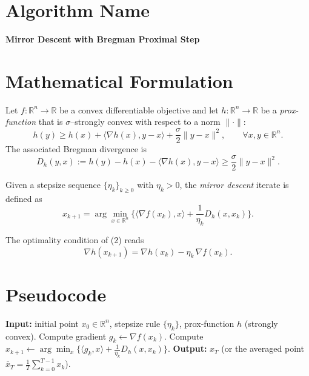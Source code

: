 \documentclass[11pt]{article}
\newcommand{\R}{\mathbb{R}}
\begin{document}
\section*{Algorithm Name}
\textbf{Mirror Descent with Bregman Proximal Step}

\section*{Mathematical Formulation}
Let $f:\R^{n}\rightarrow\R$ be a convex differentiable objective and let 
$h:\R^{n}\rightarrow\R$ be a \emph{prox‐function} that is $\sigma$–strongly convex
with respect to a norm $\|\cdot\|$:
\[
h(y)\ge h(x)+\langle\nabla h(x),y-x\rangle+\frac{\sigma}{2}\|y-x\|^{2},
\qquad\forall x,y\in\R^{n}.
\]
The associated Bregman divergence is
\[
D_{h}(y,x):=h(y)-h(x)-\langle\nabla h(x),y-x\rangle\ge
\frac{\sigma}{2}\|y-x\|^{2}. \tag{1}
\]

Given a stepsize sequence $\{\eta_{k}\}_{k\ge0}$ with $\eta_{k}>0$, the
\emph{mirror descent} iterate is defined as
\[
x_{k+1}
= \arg\min_{x\in\R^{n}}\Big\{
\langle \nabla f(x_{k}),x\rangle
+\frac{1}{\eta_{k}} D_{h}(x,x_{k})
\Big\}. \tag{2}
\]

The optimality condition of (2) reads
\[
\nabla h(x_{k+1}) = \nabla h(x_{k}) - \eta_{k}\,\nabla f(x_{k}). \tag{3}
\]

\section*{Pseudocode}
\begin{algorithm}[H]
\caption{Mirror Descent}
\begin{algorithmic}[1]
\State \textbf{Input:} initial point $x_{0}\in\R^{n}$, stepsize rule $\{\eta_{k}\}$,
prox‑function $h$ (strongly convex).
    \State Compute gradient $g_{k}\gets \nabla f(x_{k})$.
    \State Compute 
    $x_{k+1}\gets\arg\min_{x}\big\{\langle g_{k},x\rangle+\frac{1}{\eta_{k}}D_{h}(x,x_{k})\big\}$.
\EndFor
\State \textbf{Output:} $x_{T}$ (or the averaged point $\bar x_{T}=\frac{1}{T}\sum_{k=0}^{T-1}x_{k}$).
\end{algorithmic}
\end{algorithm}
\end{document}
